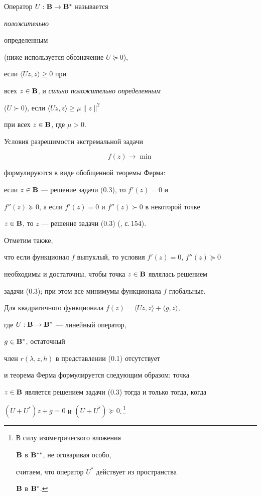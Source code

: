 Оператор $U:\bold B{}\to\bold B{}^*$ называется {\it положительно


определенным} (ниже используется обозначение $U\succeq0$),


если $\langle Uz,z\rangle\ge0$ при


всех $z\in\bold B{}$, и {\it сильно положительно определенным}


($U\succ0$), если $\langle Uz,z\rangle\ge\mu\|z\|^2$


при всех $z\in\bold B{}$, где $\mu>0$.





Условия разрешимости экстремальной задачи


\begin{equation}


f(z)\longrightarrow\min\tag{0.3}


\end{equation}


формулируются в виде обобщенной теоремы Ферма:


если $z\in\bold B{}$ --- решение задачи (0.3), то $f'(z)=0$ и


$f''(z)\succeq0$, а если $f'(z)=0$ и $f''(z)\succ0$ в некоторой точке


$z\in\bold B{}$, то $z$ --- решение задачи (0.3) (\cite{KF}, с.\,154).


Отметим также,


что если функционал $f$ выпуклый, то условия $f'(z)=0$, $f''(z)\succeq0$


необходимы и достаточны, чтобы точка $z\in\bold B{}$ являлась решением


задачи (0.3); при этом все минимумы функционала $f$ глобальные.





Для квадратичного функционала $f(z)=\langle Uz,z\rangle+\langle


g,z\rangle$,


где $U:\bold B{}\to\bold B{}^*$ --- линейный оператор,


$g\in\bold B{}^*$, остаточный


член $r(\lambda,z,h)$ в представлении (0.1) отсутствует


и теорема Ферма формулируется следующим образом: точка


$z\in\bold B{}$ является решением задачи (0.3) тогда и только тогда, когда


$(U+U^*)z+g=0$ и $(U+U^*)\succeq0$.\,\footnote{В силу изометрического вложения


$\bold B{}$ в $\bold B{}^{**}$, не оговаривая особо,


считаем, что оператор $U^*$ действует из пространства


$\bold B{}$ в $\bold B{}^*$.}





